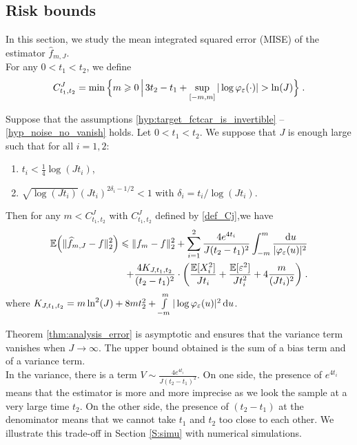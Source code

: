 \subsection{Risk bounds}
\label{sec:risk_decompound}
In this section, we study the mean integrated squared error (MISE) of the estimator $\hat f_{m, J}$. \\

For any $0 < t_1 < t_2$, we define
	\begin{equation}\label{def_Cj}
	C^J_{t_1, t_2} = \min \Big\{ m \geqslant 0 \, \Big| \, 3t_2 - t_1 + \sup_{[-m, m]}| \log \varphi_{\varepsilon}(\cdot)| > \ln(J) \Big\} 
	\; .
	\end{equation}	

\begin{theorem}\label{thm:analysis_error}
Suppose that the assumptions \ref{hyp:target_fctcar_is_invertible} -- \ref{hyp_noise_no_vanish} holds.
Let $0 < t_1 < t_2 $. We suppose that $J$ is enough large such that for all $i = 1,2$:
\begin{enumerate}
    \item $t_i < \frac{1}{4} \log(J t_i)$,
    \item $\sqrt{\log(J t_i)} (J t_i)^{2\delta_i-1/2} < 1$ with $\delta_i = t_i / \log(J t_i)$.
\end{enumerate}
Then for any $m < C^J_{t_1, t_2}$ with $ C^J_{t_1, t_2}$ defined by \eqref{def_Cj},we have
	\begin{equation*}
    \begin{split}
    \mathbb{E} \Big(\lVert\widehat f_{m, J} - f \rVert_2^2 \Big)
    \leqslant  \lVert f_m - f\rVert_2^2 
		+ \sum_{i = 1}^2 \frac{4 e^{4t_i}}{J (t_2 - t_1)^2} \int_{-m}^{m} \frac{\, \mathrm du}{|\varphi_{\varepsilon}(u)|^2}
		\\     
		+\frac{4 K_{J, t_1, t_2}}{(t_2 - t_1)^2} 
	    \cdot \bigg( \frac{\mathbb{E}[X_i^2]}{J t_i} 
		+ \frac{\mathbb{E}[\varepsilon^2]}{J t_i^2} + 4 \frac{m}{(J t_i)^2} \bigg)
	\; .	
    \end{split}
	\end{equation*}
	where $K_{J, t_1, t_2} = m \ln^2(J)
	 + 
	 8 m t_2^2
	 +
	 \int\limits_{-m}^m | \log\varphi_\varepsilon (u)|^2 \, \mathrm du $.
\end{theorem}

\begin{remark} Theorem  \ref{thm:analysis_error} is asymptotic and ensures that the variance term vanishes when $J \to \infty$. The upper bound obtained is the sum of a bias term and of a variance term. \\
In the variance, there is a term $V \sim \frac{4 e^{4t_i}}{J (t_2 - t_1)^2} $. On one side, the presence of $e^{4t_i}$ means that the estimator is more and more imprecise as we look the sample at a very large time $t_2$. On the other side, the presence of $(t_2 - t_1)$ at the denominator means that we cannot take $t_1$ and $t_2$ too close to each other. We illustrate this trade-off in Section \ref{S:simu} with numerical simulations.
\end{remark}

